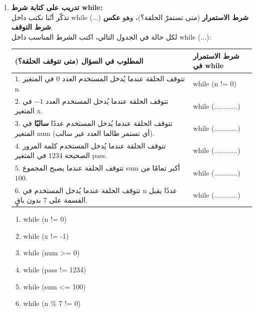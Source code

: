 \documentclass[14pt]{extarticle}
\begin{document}
\begin{enumerate}[resume, itemsep=2em]

\item \textbf{تدريب على كتابة شرط \textenglish{while}:} \\
تذكّر أنّنا نكتب داخل \textenglish{while (...)} \textbf{شرط الاستمرار} (متى تستمرّ الحلقة؟)، وهو \textbf{عكس شرط التوقف}. \\
لكل حالة في الجدول التالي، اكتب الشرط المناسب داخل \textenglish{while (...)}:

{\centering
\renewcommand{\arraystretch}{1.6}
\begin{tabular}{|>{\raggedleft\arraybackslash}p{}|>{\centering\arraybackslash}p{}|}
\hline
\textbf{المطلوب في السؤال (متى تتوقف الحلقة؟)} & \textbf{شرط الاستمرار في \textenglish{while}} \\
\hline
$1$. تتوقف الحلقة عندما يُدخل المستخدم العدد $0$ في المتغير \textenglish{n}. & \textenglish{while (n != 0)} \\
\hline
$2$. تتوقف الحلقة عندما يُدخل المستخدم العدد $-1$ في المتغير \textenglish{x}. & \textenglish{while (............)} \\
\hline
$3$. تتوقف الحلقة عندما يُدخل المستخدم عددًا \textbf{سالبًا} في المتغير \textenglish{num} (أي تستمر طالما العدد غير سالب). & \textenglish{while (............)} \\
\hline
$4$. تتوقف الحلقة عندما يُدخل المستخدم كلمة المرور الصحيحة $1234$ في المتغير \textenglish{pass}. & \textenglish{while (............)} \\
\hline
$5$. تتوقف الحلقة عندما يصبح المجموع \textenglish{sum} أكبر تمامًا من $100$. & \textenglish{while (............)} \\
\hline
$6$. تتوقف الحلقة عندما يُدخل المستخدم في \textenglish{n} عددًا يقبل القسمة على $7$ بدون باقٍ. & \textenglish{while (............)} \\
\hline
\end{tabular}
\par}
\ifwithsols
\begin{boxSolution}
\begin{enumerate}[nosep]
    \item \textenglish{while (n != 0)}
    \item \textenglish{while (x != -1)}
    \item \textenglish{while (num >= 0)}
    \item \textenglish{while (pass != 1234)}
    \item \textenglish{while (sum <= 100)}
    \item \textenglish{while (n \% 7 != 0)}
\end{enumerate}
\end{boxSolution}
\fi
\filbreak


\end{enumerate}
\end{document}
